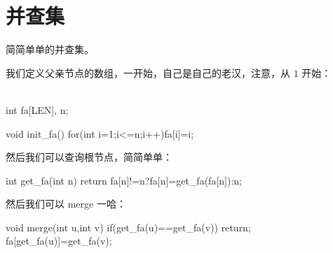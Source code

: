 \section{并查集}
简简单单的并查集。

我们定义父亲节点的数组，一开始，自己是自己的老汉，注意，从 $1$ 开始：
\begin{Cpp}
\\ int fa[LEN], n;

void init_fa(){
  for(int i=1;i<=n;i++)fa[i]=i;
}
\end{Cpp}

然后我们可以查询根节点，简简单单：
\begin{Cpp}
int get_fa(int n){
  return fa[n]!=n?fa[n]=get_fa(fa[n]):n;
}
\end{Cpp}

然后我们可以 merge 一哈：
\begin{Cpp}
void merge(int u,int v){
  if(get_fa(u)==get_fa(v)) return;
  fa[get_fa(u)]=get_fa(v);
}
\end{Cpp}


